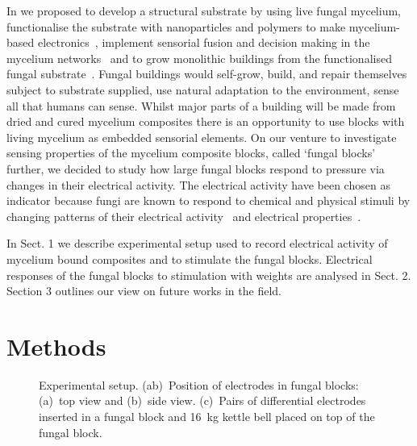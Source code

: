 \documentclass[]{elsarticle}
\begin{document}
In \cite{adamatzky2019fungal} we proposed to develop a structural substrate by using live fungal mycelium, functionalise the substrate with nanoparticles and polymers to make mycelium-based electronics~\cite{beasley2020capacitive,beasley2020mem,beasley2020fungal}, implement sensorial fusion and decision making in the mycelium networks~\cite{adamatzky2020boolean} and to grow monolithic buildings from the functionalised fungal substrate~\cite{adamatzky5adaptive}. 
Fungal buildings would self-grow, build, and repair themselves subject to substrate supplied, use natural adaptation to the environment, sense all that humans can sense. Whilst major parts of a building will be made from dried and cured mycelium composites there is an opportunity to use blocks with living mycelium as embedded sensorial elements. On our venture to investigate sensing properties of the mycelium composite blocks, called `fungal blocks' further, we decided to study how large fungal blocks respond to pressure via changes in their electrical activity. The electrical activity have been chosen as indicator because fungi are known to respond to chemical and physical stimuli by changing patterns of their electrical activity~\cite{olsson1995action,adamatzky2018spiking,adamatzky2018towards} and electrical properties~\cite{beasley2020fungal}. 

In Sect. 1 we describe experimental setup used to record electrical activity of mycelium bound composites and to stimulate the fungal blocks. Electrical responses of the fungal blocks to stimulation with weights are analysed in Sect. 2. Section 3 outlines our view on future works in the field.



\section{Methods}


\begin{figure}[!tbp]
    \centering
 \subfigure[]{\texttt{[image: 16kg]}}
    \caption{Experimental setup. (ab)~Position of electrodes in fungal blocks: (a)~top view and (b)~side view. (c)~Pairs of differential electrodes inserted in a fungal block and 16~kg kettle bell placed on top of the fungal block.}
    \label{fig:setup}
\end{figure}
\end{document}
